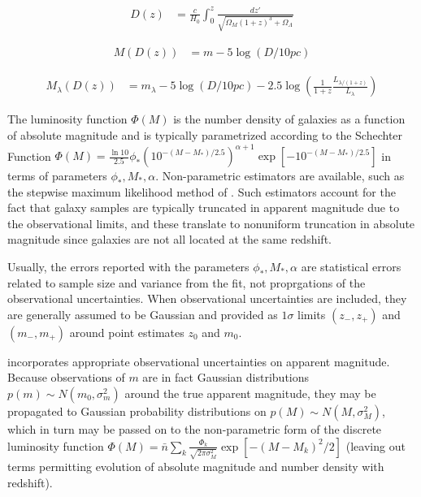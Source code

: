\documentclass[12pt, onecolumn]{emulateapj}
\begin{document}
\begin{eqnarray}
\label{eq:D}
D(z) &= \frac{c}{H_{0}}\int_{0}^{z}\frac{dz'}{\sqrt{\Omega_{M}(1+z)^{3}+\Omega_{\Lambda}}}
\end{eqnarray}

\begin{mathletters}
\begin{eqnarray}
\label{eq:M}
M(D(z)) &= m-5\log(D/10pc)
\end{eqnarray}

\begin{eqnarray}
\label{eq:MK}
M_{\lambda}(D(z)) &= m_{\lambda}-5\log(D/10pc)-2.5\log(\frac{1}{1+z}\frac{L_{\lambda/(1+z)}}{L_{\lambda}})
\end{eqnarray}
\end{mathletters}

The luminosity function $\Phi(M)$ is the number density of galaxies as a function of absolute magnitude and is typically parametrized according to the Schechter Function $\Phi(M)=\frac{\ln10}{2.5} \phi_{*}(10^{-(M-M_{*})/2.5})^{\alpha+1}\exp[-10^{-(M-M_{*})/2.5}]$ in terms of parameters $\phi_{*},M_{*},\alpha$.  Non-parametric estimators are available, such as the stepwise maximum likelihood method of \citet{efs88}.  Such estimators account for the fact that galaxy samples are typically truncated in apparent magnitude due to the observational limits, and these translate to nonuniform truncation in absolute magnitude since galaxies are not all located at the same redshift.  

Usually, the errors reported with the parameters $\phi_{*},M_{*},\alpha$ are statistical errors related to sample size and variance from the fit, not proprgations of the observational uncertainties.  When observational uncertainties are included, they are generally assumed to be Gaussian and provided as $1\sigma$ limits $(z_{-},z_{+})$ and $(m_{-},m_{+})$ around point estimates $z_{0}$ and $m_{0}$.  

\citet{bla02} incorporates appropriate observational uncertainties on apparent magnitude.  Because observations of $m$ are in fact Gaussian distributions $p(m)\sim N(m_{0},\sigma_{m}^{2})$ around the true apparent magnitude, they may be propagated to Gaussian probability distributions on $p(M)\sim N(M,\sigma_{M}^{2})$, which in turn may be passed on to the non-parametric form of the discrete luminosity function $\Phi(M)=\bar{n}\sum_{k}\frac{\Phi_{k}}{\sqrt{2\pi\sigma_{M}^{2}}}\exp[-(M-M_{k})^{2}/2]$ (leaving out terms permitting evolution of absolute magnitude and number density with redshift).  
\end{document}
